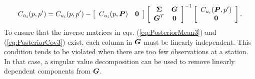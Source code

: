 \documentclass[extra,mreferee]{gji}
\begin{document}
\begin{equation}\label{eq:PosteriorCov3}
C_{\hat{u}_i}(p,p') = C_{u_i}(p,p') - 
                    \left[\begin{array}{cc}
                          C_{u_i}(p,\mitbf{P}) & \mitbf{0} \\
                          \end{array}\right]
                    \left[\begin{array}{cc}
                          \mitbf{\Sigma} & \mitbf{G} \\
                          \mitbf{G}^T  & \mitbf{0} \\
                          \end{array}\right]^{-1}
                    \left[\begin{array}{c}
                          C_{u_i}(\mitbf{P},p') \\
                          \mitbf{0} \\
                          \end{array}\right].
\end{equation}
To ensure that the inverse matrices in eqs. (\ref{eq:PosteriorMean3}) and (\ref{eq:PosteriorCov3}) exist, each column in $\mitbf{G}$ must be linearly independent. This condition tends to be violated when there are too few observations at a station. In that case, a singular value decomposition can be used to remove linearly dependent components from $\mitbf{G}$.   
 
\end{document}
